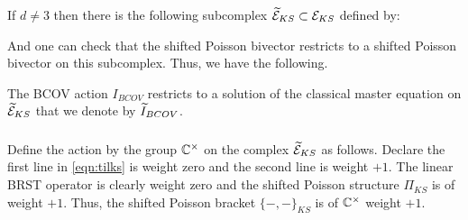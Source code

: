 \documentclass[11pt]{amsart}
\begin{document}
If $d \ne 3$ then there is the following subcomplex $\widetilde{\mathcal E}_{KS}\subset \mathcal E_{KS}$ defined by:
\beqn\label{eqn:tilks}
\eeqn
And one can check that the shifted Poisson bivector restricts to a shifted Poisson bivector on this subcomplex. 
Thus, we have the following.

\begin{prop}
\label{prop:tilbcov}
The BCOV action $I_{BCOV}$ restricts to a solution of the classical master equation on $\widetilde{\mathcal E}_{KS}$ that we denote by $\widetilde{I}_{BCOV}$. 
\end{prop}

\subsubsection{}

Define the action by the group $\mathbb C^\times$ on the complex $\widetilde{\mathcal E}_{KS}$ as follows.
Declare the first line in \eqref{eqn:tilks} is weight zero and the second line is weight $+1$. 
The linear BRST operator is clearly weight zero and the shifted Poisson structure $\Pi_{KS}$ is of weight $+1$. 
Thus, the shifted Poisson bracket $\{-,-\}_{KS}$ is of $\mathbb C^\times$ weight $+1$.
\end{document}
